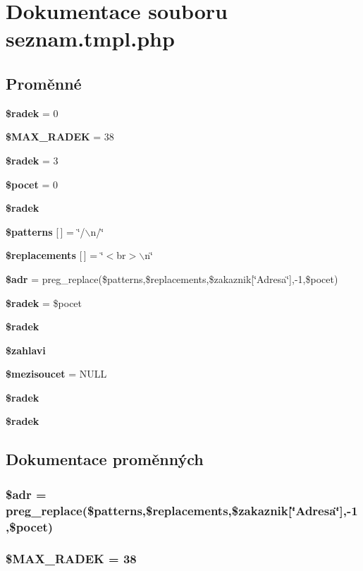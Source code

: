 \section{Dokumentace souboru seznam.tmpl.php}
\label{seznam_8tmpl_8php}
\subsection*{Proměnné}
\begin{CompactItemize}
\item 
{\bf \$radek} = 0
\item 
{\bf \$MAX\_\-RADEK} = 38
\item 
{\bf \$radek} = 3
\item 
{\bf \$pocet} = 0
\item 
{\bf \$radek}
\item 
{\bf \$patterns} [$\,$] = \char`\"{}/$\backslash$n/\char`\"{}
\item 
{\bf \$replacements} [$\,$] = \char`\"{}$<$br$>$$\backslash$n\char`\"{}
\item 
{\bf \$adr} = preg\_\-replace(\$patterns,\$replacements,\$zakaznik[\char`\"{}Adresa\char`\"{}],-1,\$pocet)
\item 
{\bf \$radek} = \$pocet
\item 
{\bf \$radek}
\item 
{\bf \$zahlavi}
\item 
{\bf \$mezisoucet} = NULL
\item 
{\bf \$radek}
\item 
{\bf \$radek}
\end{CompactItemize}


\subsection{Dokumentace proměnných}
\subsubsection{\setlength{\rightskip}{0pt plus 5cm}\$adr = preg\_\-replace(\$patterns,\$replacements,\$zakaznik[\char`\"{}Adresa\char`\"{}],-1,\$pocet)}\label{seznam_8tmpl_8php_10d8a7303f36845147fe69faab2e6cbc}


\subsubsection{\setlength{\rightskip}{0pt plus 5cm}\$MAX\_\-RADEK = 38}\label{seznam_8tmpl_8php_a4356f71ca78075652ff7acba02d1c38}



